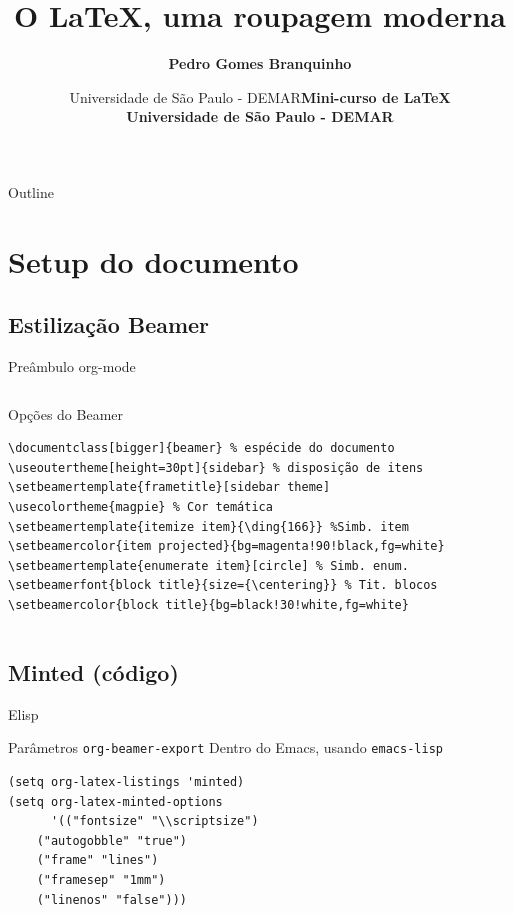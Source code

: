 \documentclass[bigger]{beamer}
\date{  Universidade de São Paulo - DEMAR}
\title{O \LaTeX{}, uma roupagem moderna}
\author[Branquinho]{\textbf{Pedro Gomes Branquinho \\ \text{\scriptsize{pedro.branquinho@usp.br}}}}
\date[EEL-USP]{\textbf{\scriptsize{Mini-curso de \LaTeX} \\ Universidade de São Paulo - DEMAR}}
\begin{document}
\maketitle
\begin{frame}{Outline}
\tableofcontents
\end{frame}



\section{Setup do documento}
\label{sec:org9a64baa}
{
\subsection{Estilização Beamer}
\label{sec:org983116d}
\begin{frame}[label={sec:orgd9020dd},fragile]{Preâmbulo org-mode}
 \begin{columns}
\begin{column}{0.92\columnwidth}
\begin{block}{Opções do Beamer}
\begin{verbatim}
\documentclass[bigger]{beamer} % espécide do documento
\useoutertheme[height=30pt]{sidebar} % disposição de itens
\setbeamertemplate{frametitle}[sidebar theme]
\usecolortheme{magpie} % Cor temática
\setbeamertemplate{itemize item}{\ding{166}} %Simb. item
\setbeamercolor{item projected}{bg=magenta!90!black,fg=white}
\setbeamertemplate{enumerate item}[circle] % Simb. enum.
\setbeamerfont{block title}{size={\centering}} % Tit. blocos
\setbeamercolor{block title}{bg=black!30!white,fg=white}
\end{verbatim}
\end{block}
\end{column}
\end{columns}
\end{frame}

\subsection{Minted (código)}
\label{sec:org50fffd7}
\begin{frame}[label={sec:orgcc7826f},fragile]{Elisp}
 \begin{block}{Parâmetros \texttt{org-beamer-export}}
Dentro do Emacs, usando \texttt{emacs-lisp}
\begin{verbatim}
(setq org-latex-listings 'minted)
(setq org-latex-minted-options
      '(("fontsize" "\\scriptsize")
	("autogobble" "true")
	("frame" "lines")
	("framesep" "1mm")
	("linenos" "false")))
\end{verbatim}
\end{block}
\end{frame}

}
\end{document}
